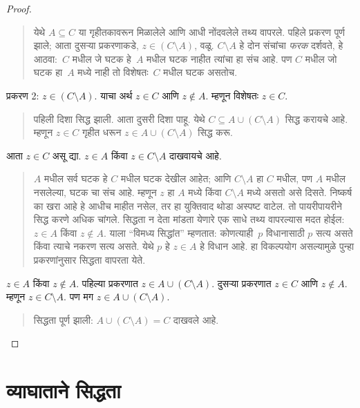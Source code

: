 \begin{proof}
\begin{quote}
येथे $A \subseteq C$ या गृहीतकावरून मिळालेले आणि आधी नोंदवलेले तथ्य वापरले. पहिले प्रकरण पूर्ण झाले; आता दुसऱ्या प्रकरणाकडे, $z \in (C \setminus A)$, वळू. $C \setminus A$ हे दोन संचांचा \emph{फरक} दर्शवते, हे आठवा:~$C$ मधील जे घटक हे~$A$ मधील घटक नाहीत त्यांचा हा संच आहे. पण $C$ मधील जो घटक हा~$A$ मध्ये नाही तो विशेषतः~$C$ मधील घटक असतोच.
\end{quote}
प्रकरण 2: $z \in (C \setminus A)$. याचा अर्थ $z \in C$ आणि $z \notin A$. म्हणून विशेषतः $z \in C$.
\begin{quote}
पहिली दिशा सिद्ध झाली. आता दुसरी दिशा पाहू. येथे $C \subseteq A \cup (C \setminus A)$ सिद्ध करायचे आहे. म्हणून $z \in C$ गृहीत धरून $z \in A \cup (C \setminus A)$ सिद्ध करू.
\end{quote}
आता $z \in C$ असू द्या. $z \in A$ किंवा $z \in C \setminus A$ दाखवायचे आहे.
\begin{quote}
$A$ मधील सर्व घटक हे $C$ मधील घटक देखील आहेत; आणि $C \setminus A$ हा $C$ मधील, पण $A$ मधील नसलेल्या, घटक चा संच आहे. म्हणून $z$ हा $A$ मध्ये किंवा $C \setminus A$ मध्ये असतो असे दिसते. निष्कर्ष का खरा आहे हे आधीच माहीत नसेल, तर हा युक्तिवाद थोडा अस्पष्ट वाटेल. तो पायरीपायरीने सिद्ध करणे अधिक चांगले. सिद्धता न देता मांडता येणारे एक साधे तथ्य वापरल्यास मदत होईल: $z \in A$ किंवा $z \notin A$. याला “विमध्य सिद्धांत” म्हणतात: कोणत्याही~$p$ विधानासाठी $p$ सत्य असते किंवा त्याचे नकरण सत्य असते. येथे $p$ हे $z \in A$ हे विधान आहे. हा विकल्पयोग असल्यामुळे पुन्हा प्रकरणांनुसार सिद्धता वापरता येते.
\end{quote}
$z \in A$ किंवा $z \notin A$. पहिल्या प्रकरणात $z \in A \cup (C \setminus A)$. दुसऱ्या प्रकरणात $z \in C$ आणि $z \notin A$. म्हणून $z \in C \setminus A$. पण मग $z \in A \cup (C \setminus A)$.
\begin{quote}
सिद्धता पूर्ण झाली: $A \cup (C \setminus A) = C$ दाखवले आहे.
\end{quote}
\end{proof}












\section{व्याघाताने सिद्धता}\label{mth:prf:con:sec}

